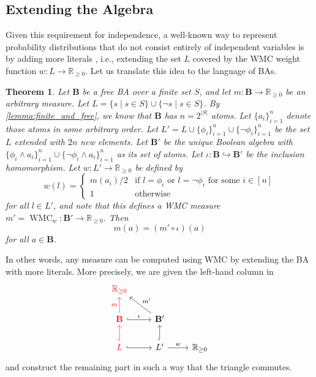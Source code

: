 \documentclass{article}
\newtheorem{theorem}{Theorem}
\theoremstyle{definition}
\theoremstyle{remark}
\DeclareMathOperator{\WMC}{WMC}
\begin{document}
\subsection{Extending the Algebra}

Given this requirement for independence, a well-known way to represent
probability distributions that do not consist entirely of independent variables
is by adding more literals \cite{DBLP:journals/ai/ChaviraD08}, i.e., extending
the set $L$ covered by the WMC weight function $w\colon L \to \mathbb{R}_{\ge
  0}$. Let us translate this idea to the language of BAs.

\begin{theorem} \label{thm:extension}
  Let $\mathbf{B}$ be a free BA over a finite set $S$, and let $m\colon
  \mathbf{B} \to \mathbb{R}_{\ge 0}$ be an arbitrary measure. Let $L = \{ s \mid
  s \in S \} \cup \{ \neg s \mid s \in S \}$. By \cref{lemma:finite_and_free},
  we know that $\mathbf{B}$ has $n = 2^{|S|}$ atoms. Let $\{a_i\}_{i=1}^n$
  denote those atoms in some arbitrary order. Let $L' = L \cup \{ \phi_i
  \}_{i=1}^n \cup \{\neg \phi_i \}_{i=1}^n$ be the set $L$ extended with $2n$
  new elements. Let $\mathbf{B'}$ be the unique Boolean algebra with $\{ \phi_i
  \land a_i \}_{i=1}^n \cup \{ \neg \phi_i \land a_i \}_{i=1}^n$ as its set of
  atoms. Let $\iota\colon \mathbf{B} \hookrightarrow \mathbf{B'}$ be the
  inclusion homomorphism. Let $w\colon L' \to \mathbb{R}_{\ge 0}$ be defined by
  \[
    w(l) = \begin{cases}
      m(a_i)/2 & \text{if } l = \phi_i \text{ or } l = \neg\phi_i \text{ for
        some } i \in [n] \\
      1 & \text{otherwise}
    \end{cases}
  \]
  for all $l \in L'$, and note that this defines a WMC measure $m' =
  \WMC_{w}\colon \mathbf{B'} \to \mathbb{R}_{\ge 0}$. Then
  \[
    m(a) = (m' \circ \iota)(a)
  \]
  for all $a \in \mathbf{B}$.
\end{theorem}

In other words, any measure can be computed using WMC by extending the BA with
more literals. More precisely, we are given the left-hand column in
\[
  \begin{tikzcd}
    \textcolor{red}{\mathbb{R}_{\ge 0}} & & \\
    \textcolor{red}{\mathbf{B}} \arrow[red]{u}{m} \ar[r,hookrightarrow,"\iota"]
    & \mathbf{B'} \arrow{lu}[swap]{m'} & \\
    \textcolor{red}{L} \ar[u,red,hookrightarrow] \ar[r,hookrightarrow] & L'
    \ar[u,hookrightarrow] \arrow{r}{w} & \mathbb{R}_{\ge 0}
  \end{tikzcd}
\]
and construct the remaining part in such a way that the triangle commutes.
\end{document}
